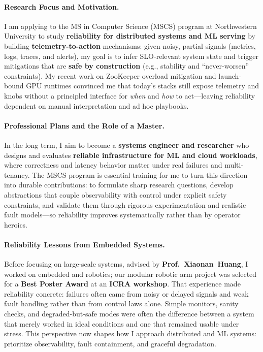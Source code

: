 \documentclass{article}
\newcommand{\school}{Northwestern University\xspace}
\begin{document}
\paragraph{Research Focus and Motivation.}
I am applying to the MS in Computer Science (MSCS) program at \school{} to study \textbf{reliability for distributed systems and ML serving} by building \textbf{telemetry-to-action} mechanisms: given noisy, partial signals (metrics, logs, traces, and alerts), my goal is to infer SLO-relevant system state and trigger mitigations that are \textbf{safe by construction} (e.g., stability and “never-worsen” constraints). My recent work on ZooKeeper overload mitigation and launch-bound GPU runtimes convinced me that today's stacks still expose telemetry and knobs without a principled interface for \emph{when} and \emph{how} to act---leaving reliability dependent on manual interpretation and ad hoc playbooks.

\paragraph{Professional Plans and the Role of a Master.}
In the long term, I aim to become a \textbf{systems engineer and researcher} who designs and evaluates \textbf{reliable infrastructure for ML and cloud workloads}, where correctness and latency behavior matter under real failures and multi-tenancy. The MSCS program is essential training for me to turn this direction into durable contributions: to formulate sharp research questions, develop abstractions that couple observability with control under explicit safety constraints, and validate them through rigorous experimentation and realistic fault models---so reliability improves systematically rather than by operator heroics.

\paragraph{Reliability Lessons from Embedded Systems.}
Before focusing on large-scale systems, advised by \textbf{Prof.~Xiaonan~Huang}, I worked on embedded and robotics; our modular robotic arm project was selected for a \textbf{Best Poster Award} at an \textbf{ICRA workshop}. That experience made reliability concrete: failures often came from noisy or delayed signals and weak fault handling rather than from control laws alone. Simple monitors, sanity checks, and degraded-but-safe modes were often the difference between a system that merely worked in ideal conditions and one that remained usable under stress. This perspective now shapes how I approach distributed and ML systems: prioritize observability, fault containment, and graceful degradation.
\end{document}
